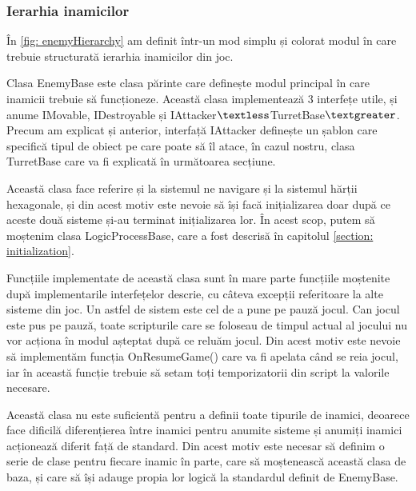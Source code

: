 \documentclass[12pt, a4paper]{article}
\begin{document}
	
	
	
	
	\subsubsection{Ierarhia inamicilor}
	

	În \ref{fig: enemyHierarchy} am definit într-un mod simplu și colorat modul în care trebuie structurată ierarhia inamicilor din joc.
	\newline
	
	Clasa EnemyBase este clasa părinte care definește modul principal în care inamicii trebuie să funcționeze. Această clasa implementează 3 interfețe utile, și anume IMovable, IDestroyable și IAttacker$\textless$TurretBase$\textgreater$. Precum am explicat și anterior, interfață IAttacker definește un șablon care specifică tipul de obiect pe care poate să îl atace, în cazul nostru, clasa TurretBase care va fi explicată în următoarea secțiune.
	\newline
	
	Această clasa face referire și la sistemul ne navigare și la sistemul hărții hexagonale, și din acest motiv este nevoie să își facă inițializarea doar după ce aceste două sisteme și-au terminat inițializarea lor. În acest scop, putem să moștenim clasa LogicProcessBase, care a fost descrisă în capitolul \ref{section: initialization}.
	\newline
	
	Funcțiile implementate de această clasa sunt în mare parte funcțiile moștenite după implementarile interfețelor descrie, cu câteva excepții referitoare la alte sisteme din joc. Un astfel de sistem este cel de a pune pe pauză jocul. Can jocul este pus pe pauză, toate scripturile care se foloseau de timpul actual al jocului nu vor acționa în modul așteptat după ce reluăm jocul. Din acest motiv este nevoie să implementăm funcția OnResumeGame() care va fi apelata când se reia jocul, iar în această funcție trebuie să setam toți temporizatorii din script la valorile necesare.
	\newline
	
	Această clasa nu este suficientă pentru a definii toate tipurile de inamici, deoarece face dificilă diferențierea între inamici pentru anumite sisteme și anumiți inamici acționează diferit față de standard. Din acest motiv este necesar să definim o serie de clase pentru fiecare inamic în parte, care să moștenească această clasa de baza, și care să își adauge propia lor logică la standardul definit de EnemyBase.
	\newline
	
\end{document}
